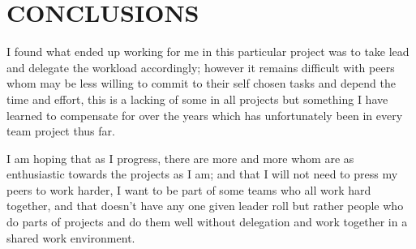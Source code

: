 \documentclass[a4paper, 10pt]{IEEEconf}
\begin{document}

\section{CONCLUSIONS}

I found what ended up working for me in this particular project was to take lead and delegate the workload accordingly; however it remains difficult with peers whom may be less willing to commit to their self chosen tasks and depend the time and effort, this is a lacking of some in all projects but something I have learned to compensate for over the years which has unfortunately been in every team project thus far. 

I am hoping that as I progress, there are more and more whom are as enthusiastic towards the projects as I am; and that I will not need to press my peers to work harder, I want to be part of some teams who all work hard together, and that doesn't have any one given leader roll but rather people who do parts of projects and do them well without delegation and work together in a shared work environment.
 

\nocite{*}




\clearpage
\onecolumn


\begin{lstlisting}[language = C++]

\end{lstlisting}
\end{document}
